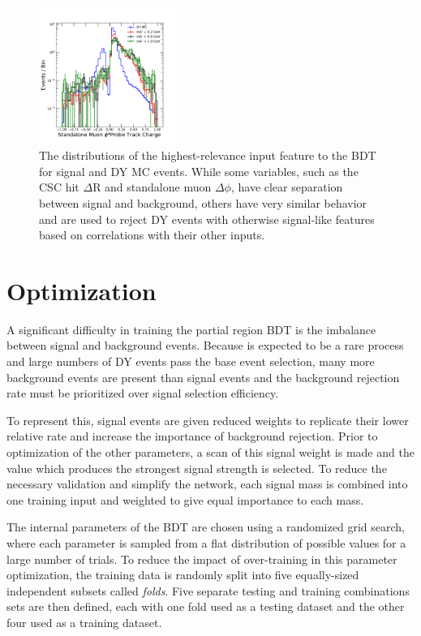 \begin{figure}[htpb]
	\includegraphics[width=0.4\textwidth]{figures/bdtInputFeatsstaPhi.pdf}
	\caption[Input BDT Classification Features]{The distributions of the highest-relevance input feature to the BDT for signal and DY MC events. While some variables, such as the CSC hit $\Delta$R and standalone muon $\Delta\phi$, have clear separation between signal and background, others have very similar behavior and are used to reject DY events with otherwise signal-like features based on correlations with their other inputs.}
	\label{fig:bdtFeatures}
\end{figure}

\section{Optimization}
A significant difficulty in training the partial region BDT is the imbalance between signal and background events. 
Because \dbrem is expected to be a rare process and large numbers of DY events pass the base event selection, many more background events are present than signal events and the background rejection rate must be prioritized over signal selection efficiency.

To represent this, signal events are given reduced weights to replicate their lower relative rate and increase the importance of background rejection.
Prior to optimization of the other parameters, a scan of this signal weight is made and the value which produces the strongest signal strength is selected.
To reduce the necessary validation and simplify the network, each signal mass is combined into one training input and weighted to give equal importance to each mass.

The internal parameters of the BDT are chosen using a randomized grid search, where each parameter is sampled from a flat distribution of possible values for a large number of trials.
To reduce the impact of over-training in this parameter optimization, the training data is randomly split into five equally-sized independent subsets called \emph{folds}.
Five separate testing and training combinations sets are then defined, each with one fold used as a testing dataset and the other four used as a training dataset.

